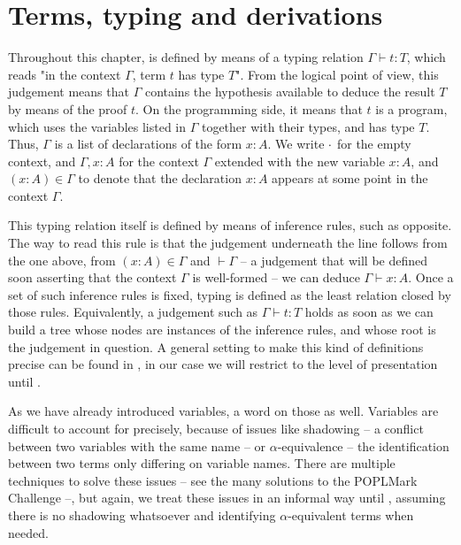 \section{Terms, typing and derivations}

Throughout this chapter,  is defined by means of a typing relation $\Gamma \vdash t : T$, which reads "in the context $\Gamma$, term $t$ has type $T$".
From the logical point of view, this judgement means that $\Gamma$
contains the hypothesis available to deduce the
result $T$ by means of the proof $t$. On the programming side, it means that
$t$ is a program, which uses the variables listed in $\Gamma$ together with their types,
and has type $T$.
Thus, $\Gamma$ is a list of declarations of the form $x : A$. We write $\emptycon$ for the
empty context, and $\Gamma, x : A$ for the context $\Gamma$ extended with the new variable $x : A$, and $(x : A) \in \Gamma$ to denote that the declaration $x : A$ appears at some
point in the context $\Gamma$.

\begin{marginfigure}
  \begin{mathpar}
  \label{rule:cic-var}
  \end{mathpar}
\end{marginfigure}

This typing relation itself is defined by means of inference rules,
such as  opposite. The way to read this rule is that the judgement
underneath the line follows from the one above,
\ie from $(x : A) \in \Gamma$
and $\vdash \Gamma$ – a judgement that will be defined soon asserting that the context
$\Gamma$ is well-formed – we can deduce $\Gamma \vdash x : A$.
Once a set of such inference rules is fixed,
typing is defined as the least relation closed by those
rules. Equivalently, a judgement such as $\Gamma \vdash t : T$
holds as soon as we can build a tree whose nodes are instances of the inference rules,
and whose root is the judgement in question. A general setting
to make this kind of definitions precise can be found in ,
in our case we will restrict to the level of presentation
until .

As we have already introduced variables, a word on those as well. Variables are difficult
to account for precisely, because of issues like shadowing – a conflict between two variables
with the same name – or $\alpha$-equivalence – the identification between two terms
only differing on variable names. There are multiple techniques to solve these issues
– see the many solutions to the POPLMark Challenge  –, 
but again, we treat these issues in an informal way until , assuming
there is no shadowing whatsoever and identifying $\alpha$-equivalent terms when needed.

